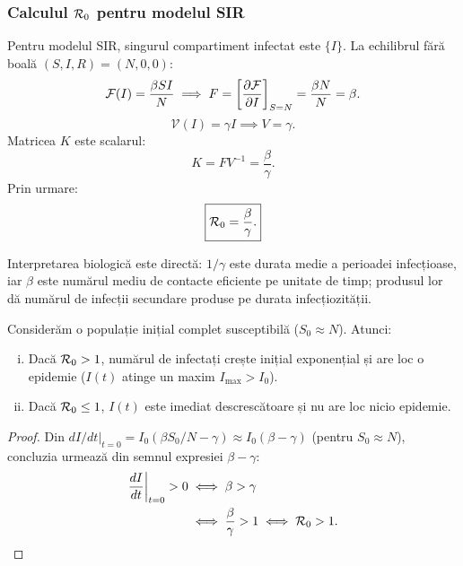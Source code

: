 \subsubsection{Calculul $\mathcal{R}_0$ pentru modelul SIR}

Pentru modelul SIR, singurul compartiment infectat este $\{I\}$.
La echilibrul fără boală $(S, I, R) = (N, 0, 0)$:
\begin{equation}
    \mathcal{F}(I) = \frac{\beta S I}{N} \implies
    F = \left[\frac{\partial \mathcal{F}}{\partial I}\right]_{S=N} = \frac{\beta N}{N} = \beta.
\end{equation}
\begin{equation}
    \mathcal{V}(I) = \gamma I \implies V = \gamma.
\end{equation}
Matricea $K$ este scalarul:
\begin{equation}
    K = F V^{-1} = \frac{\beta}{\gamma}.
\end{equation}
Prin urmare:
\begin{equation}
\label{eq:R0_sir}
    \boxed{\mathcal{R}_0 = \frac{\beta}{\gamma}.}
\end{equation}

Interpretarea biologică este directă: $1/\gamma$ este durata medie a perioadei
infecțioase, iar $\beta$ este numărul mediu de contacte eficiente pe unitate de
timp; produsul lor dă numărul de infecții secundare produse pe durata infecțiozității.

\begin{teorema}
\label{thm:prag_epidemic}
Considerăm o populație inițial complet susceptibilă ($S_0 \approx N$). Atunci:
\begin{enumerate}[(i)]
    \item Dacă $\mathcal{R}_0 > 1$, numărul de infectați crește inițial exponențial
    și are loc o epidemie ($I(t)$ atinge un maxim $I_{\max} > I_0$).
    \item Dacă $\mathcal{R}_0 \leq 1$, $I(t)$ este imediat descrescătoare și nu are
    loc nicio epidemie.
\end{enumerate}
\end{teorema}

\begin{proof}
Din $dI/dt|_{t=0} = I_0(\beta S_0/N - \gamma) \approx I_0(\beta - \gamma)$
(pentru $S_0 \approx N$), concluzia urmează din semnul expresiei $\beta - \gamma$:
\begin{align*}
    \frac{dI}{dt}\bigg|_{t=0} > 0
        &\iff \beta > \gamma \\
        &\iff \frac{\beta}{\gamma} > 1 \iff \mathcal{R}_0 > 1. \qedhere
\end{align*}
\end{proof}

